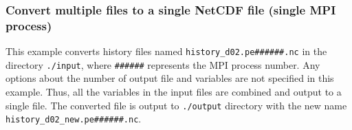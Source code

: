\subsubsection{Convert multiple \scalenetcdf files to a single NetCDF file (single MPI process)}
%
%
This example converts history files named \verb|history_d02.pe######.nc| in the directory \verb|./input|,
where \verb|######| represents the MPI process number.
Any options about the number of output file and variables are not specified in this example.
Thus, all the variables in the input files are combined and output to a single file.
The converted file is output to \verb|./output| directory with the new name \verb|history_d02_new.pe######.nc|.

